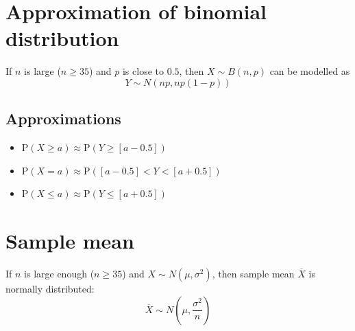 \section{Approximation of binomial distribution}
If $n$ is large ($n\geq35$) and $p$ is close to $0.5$, then $X \sim B(n,p)$ can be modelled as $$Y \sim N(np, np(1-p))$$
\subsection{Approximations}
\begin{itemize}
    \item $\text{P}(X\geq a)\approx \text{P}(Y\geq [a-0.5])$
    \item $\text{P}(X=a)\approx \text{P}([a-0.5]<Y<[a+0.5])$
    \item $\text{P}(X \leq a)\approx \text{P}(Y\leq [a+0.5])$
\end{itemize}


\section{Sample mean}
If $n$ is large enough ($n\geq35$) and $X\sim N(\mu, \sigma^2)$, then sample mean $\overline{X}$ is
normally distributed:
$$\overline{X} \sim N\left(\mu, \frac{\sigma^2}{n}\right)$$